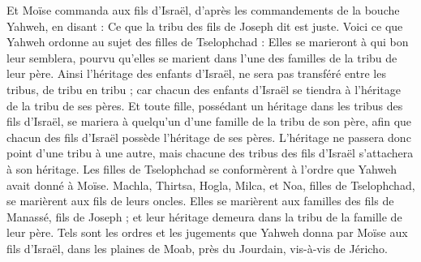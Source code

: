 \begin{multicols}{2}
Et Moïse commanda aux fils d'Israël, d’après les commandements de la bouche Yahweh, en disant : Ce que la tribu des fils de Joseph dit est juste.
Voici ce que Yahweh ordonne au sujet des filles de Tselophchad : Elles se marieront à qui bon leur semblera, pourvu qu’elles se marient dans l'une des familles de la tribu de leur père.
Ainsi l’héritage des enfants d’Israël, ne sera pas transféré entre les tribus, de tribu en tribu ; car chacun des enfants d’Israël se tiendra à l’héritage de la tribu de ses pères.
Et toute fille, possédant un héritage dans les tribus des fils d'Israël, se mariera à quelqu'un d’une famille de la tribu de son père, afin que chacun des fils d'Israël possède l'héritage de ses pères.
L'héritage ne passera donc point d'une tribu à une autre, mais chacune des tribus des fils d'Israël s’attachera à son héritage.
Les filles de Tselophchad se conformèrent à l’ordre que Yahweh avait donné à Moïse.
Machla, Thirtsa, Hogla, Milca, et Noa, filles de Tselophchad, se marièrent aux fils de leurs oncles.
Elles se marièrent aux familles des fils de Manassé, fils de Joseph ; et leur héritage demeura dans la tribu de la famille de leur père.
Tels sont les ordres et les jugements que Yahweh donna par Moïse aux fils d'Israël, dans les plaines de Moab, près du Jourdain, vis-à-vis de Jéricho.
\PPE{}
\end{multicols}
